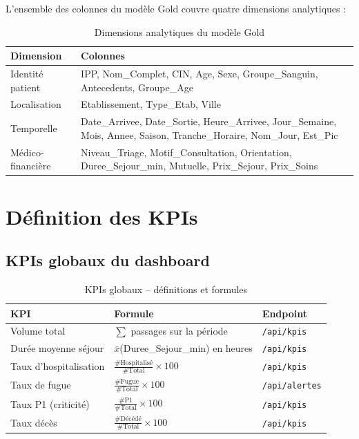 \documentclass[12pt,a4paper]{report}
\begin{document}
	L'ensemble des colonnes du modèle Gold couvre quatre dimensions analytiques :
	
	\begin{table}[H]
		\centering
		\caption{Dimensions analytiques du modèle Gold}
		\renewcommand{\arraystretch}{1.2}
		\begin{tabularx}{\textwidth}{lX}
			\toprule
			\textbf{Dimension} & \textbf{Colonnes} \\
			\midrule
			Identité patient   & IPP, Nom\_Complet, CIN, Age, Sexe, Groupe\_Sanguin, Antecedents, Groupe\_Age \\
			Localisation       & Etablissement, Type\_Etab, Ville \\
			Temporelle         & Date\_Arrivee, Date\_Sortie, Heure\_Arrivee, Jour\_Semaine, Mois, Annee, Saison, Tranche\_Horaire, Nom\_Jour, Est\_Pic \\
			Médico-financière  & Niveau\_Triage, Motif\_Consultation, Orientation, Duree\_Sejour\_min, Mutuelle, Prix\_Sejour, Prix\_Soins \\
			\bottomrule
		\end{tabularx}
	\end{table}
	\newpage
	\section{Définition des KPIs}
	
	\subsection{KPIs globaux du dashboard}
	
	\begin{table}[H]
		\centering
		\caption{KPIs globaux -- définitions et formules}
		\renewcommand{\arraystretch}{1.2}
		\begin{tabularx}{\textwidth}{lXl}
			\toprule
			\textbf{KPI} & \textbf{Formule} & \textbf{Endpoint} \\
			\midrule
			Volume total             & $\sum$ passages sur la période & \texttt{/api/kpis} \\
			Durée moyenne séjour     & $\bar{x}$(Duree\_Sejour\_min) en heures & \texttt{/api/kpis} \\
			Taux d'hospitalisation   & $\frac{\text{\# Hospitalisé}}{\text{\# Total}} \times 100$ & \texttt{/api/kpis} \\
			Taux de fugue            & $\frac{\text{\# Fugue}}{\text{\# Total}} \times 100$ & \texttt{/api/alertes} \\
			Taux P1 (criticité)      & $\frac{\text{\# P1}}{\text{\# Total}} \times 100$ & \texttt{/api/kpis} \\
			Taux décès               & $\frac{\text{\# Décédé}}{\text{\# Total}} \times 100$ & \texttt{/api/kpis} \\
			\bottomrule
		\end{tabularx}
	\end{table}
	
\end{document}
